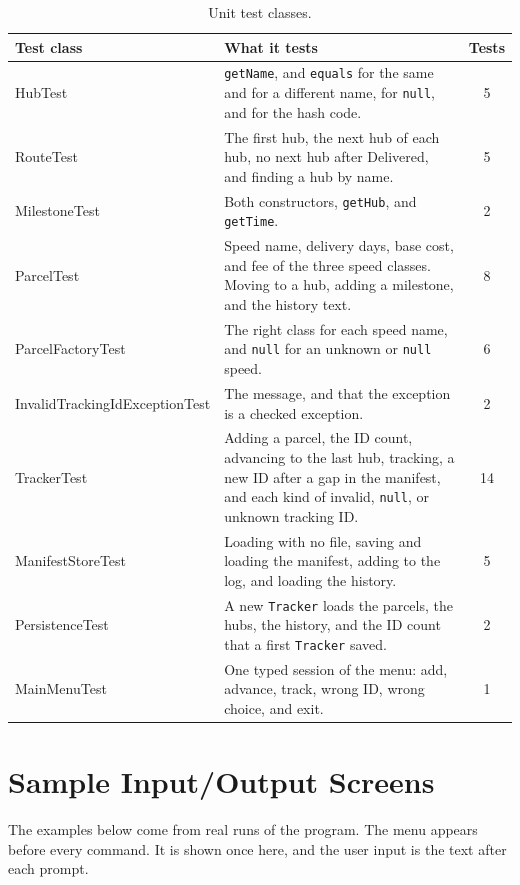 \begin{table}[h]
\centering
\caption{Unit test classes.}
\label{tab:tests}
\renewcommand{\arraystretch}{1.3}
\begin{tabularx}{\textwidth}{|p{}|X|c|}
\hline
\textbf{Test class} & \textbf{What it tests} & \textbf{Tests}\\
\hline
HubTest & \texttt{getName}, and \texttt{equals} for the same and for a different name, for \texttt{null}, and for the hash code. & 5\\
\hline
RouteTest & The first hub, the next hub of each hub, no next hub after Delivered, and finding a hub by name. & 5\\
\hline
MilestoneTest & Both constructors, \texttt{getHub}, and \texttt{getTime}. & 2\\
\hline
ParcelTest & Speed name, delivery days, base cost, and fee of the three speed classes. Moving to a hub, adding a milestone, and the history text. & 8\\
\hline
ParcelFactoryTest & The right class for each speed name, and \texttt{null} for an unknown or \texttt{null} speed. & 6\\
\hline
Invalid\-Tracking\-Id\-Exception\-Test & The message, and that the exception is a checked exception. & 2\\
\hline
TrackerTest & Adding a parcel, the ID count, advancing to the last hub, tracking, a new ID after a gap in the manifest, and each kind of invalid, \texttt{null}, or unknown tracking ID. & 14\\
\hline
ManifestStoreTest & Loading with no file, saving and loading the manifest, adding to the log, and loading the history. & 5\\
\hline
PersistenceTest & A new \texttt{Tracker} loads the parcels, the hubs, the history, and the ID count that a first \texttt{Tracker} saved. & 2\\
\hline
MainMenuTest & One typed session of the menu: add, advance, track, wrong ID, wrong choice, and exit. & 1\\
\hline
\end{tabularx}
\end{table}

\section{Sample Input/Output Screens}
The examples below come from real runs of the program. The menu appears before every command. It
is shown once here, and the user input is the text after each prompt.

